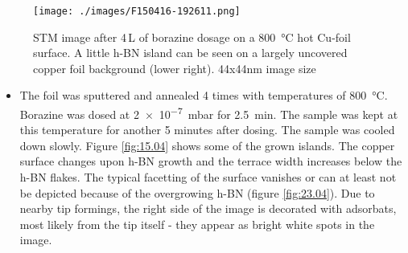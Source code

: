\begin{figure}
 \centering
 \texttt{[image: ./images/F150416-192611.png]}
 \caption{STM image after 4\,L of borazine dosage on a \SI{800}{\degreeCelsius} hot Cu-foil surface. A little h-BN island can be seen on a largely uncovered copper foil background (lower right). 44x44nm image size}
 \label{fig:16.04}
\end{figure}
% 
\begin{itemize}
 \item The foil was sputtered and annealed 4 times with temperatures of \SI{800}{\degreeCelsius}. Borazine was dosed at \SI{2e-7}{\milli \bar} for \SI{2.5}{\minute}. The sample was kept at this temperature for another 5 minutes after dosing. The sample was cooled down slowly. Figure \ref{fig:15.04} shows some of the grown islands. The copper surface changes upon h-BN growth and the terrace width increases below the h-BN flakes. The typical facetting of the surface vanishes or can at least not be depicted because of the overgrowing h-BN (figure \ref{fig:23.04}). Due to nearby tip formings, the right side of the image is decorated with adsorbats, most likely from the tip itself - they appear as bright white spots in the image.
\end{itemize}
